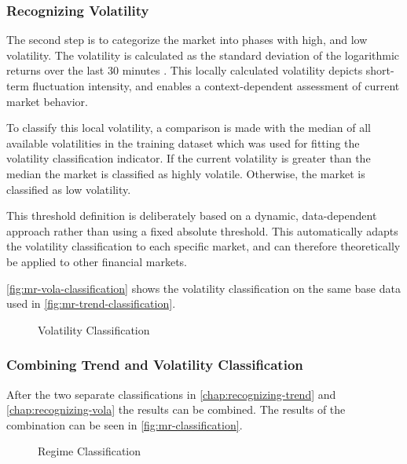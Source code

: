 \subsubsection{Recognizing Volatility}
\label{chap:recognizing-vola}

The second step is to categorize the market into phases with high, and low volatility. The volatility is calculated as the standard deviation of the logarithmic returns over the last 30 minutes \cite{wiki-vola}. This locally calculated volatility depicts short-term fluctuation intensity, and enables a context-dependent assessment of current market behavior.

To classify this local volatility, a comparison is made with the median of all available volatilities in the training dataset which was used for fitting the volatility classification indicator. If the current volatility is greater than the median the market is classified as highly volatile. Otherwise, the market is classified as low volatility.

This threshold definition is deliberately based on a dynamic, data-dependent approach rather than using a fixed absolute threshold. This automatically adapts the volatility classification to each specific market, and can therefore theoretically be applied to other financial markets.

\autoref{fig:mr-vola-classification} shows the volatility classification on the same base data used in \autoref{fig:mr-trend-classification}.

\begin{figure}[H]
    \centering
    
    \caption{Volatility Classification}
    \label{fig:mr-vola-classification}
\end{figure}

\subsubsection{Combining Trend and Volatility Classification}

After the two separate classifications in \autoref{chap:recognizing-trend} and \autoref{chap:recognizing-vola} the results can be combined. The results of the combination can be seen in \autoref{fig:mr-classification}.

\begin{figure}[H]
    \centering
    
    \caption{Regime Classification}
    \label{fig:mr-classification}
\end{figure}

